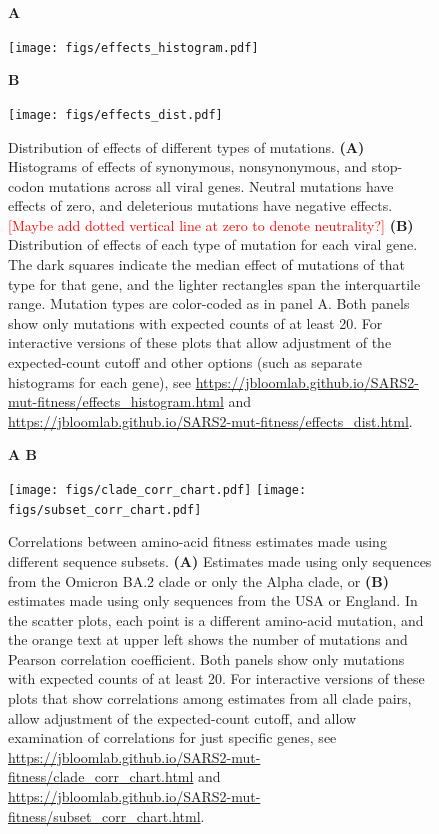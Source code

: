 \documentclass[9pt,twocolumn,twoside]{gsajnl_modified}
\newcommand\jdbcomment[1]{\textcolor{red}{[#1]}}
\begin{document}
\begin{figure}
{\bf \Large A}

\texttt{[image: figs/effects\_histogram.pdf]}

{\bf \Large B}

\texttt{[image: figs/effects\_dist.pdf]}
\caption{
Distribution of effects of different types of mutations.
{\bf (A)}
Histograms of effects of synonymous, nonsynonymous, and stop-codon mutations across all viral genes.
Neutral mutations have effects of zero, and deleterious mutations have negative effects.
\jdbcomment{Maybe add dotted vertical line at zero to denote neutrality?}
{\bf (B)}
Distribution of effects of each type of mutation for each viral gene.
The dark squares indicate the median effect of mutations of that type for that gene, and the lighter rectangles span the interquartile range.
Mutation types are color-coded as in panel A.
Both panels show only mutations with expected counts of at least 20.
For interactive versions of these plots that allow adjustment of the expected-count cutoff and other options (such as separate histograms for each gene), see \url{https://jbloomlab.github.io/SARS2-mut-fitness/effects_histogram.html} and \url{https://jbloomlab.github.io/SARS2-mut-fitness/effects_dist.html}.
\label{fig:effects_dist}
}
\end{figure}

\begin{figure}
\centering
{\bf \Large A \hspace{0.32\linewidth} B \hspace{0.32\linewidth}}

\texttt{[image: figs/clade\_corr\_chart.pdf]}
\hspace{0.05\linewidth}
\texttt{[image: figs/subset\_corr\_chart.pdf]}
\caption{
Correlations between amino-acid fitness estimates made using different sequence subsets.
{\bf (A)} Estimates made using only sequences from the Omicron BA.2 clade or only the Alpha clade, or {\bf (B)} estimates made using only sequences from the USA or England.
In the scatter plots, each point is a different amino-acid mutation, and the orange text at upper left shows the number of mutations and Pearson correlation coefficient.
Both panels show only mutations with expected counts of at least 20.
For interactive versions of these plots that show correlations among estimates from all clade pairs, allow adjustment of the expected-count cutoff, and allow examination of correlations for just specific genes, see \url{https://jbloomlab.github.io/SARS2-mut-fitness/clade_corr_chart.html} and \url{https://jbloomlab.github.io/SARS2-mut-fitness/subset_corr_chart.html}.
\label{fig:corr}
}
\end{figure}
\end{document}
